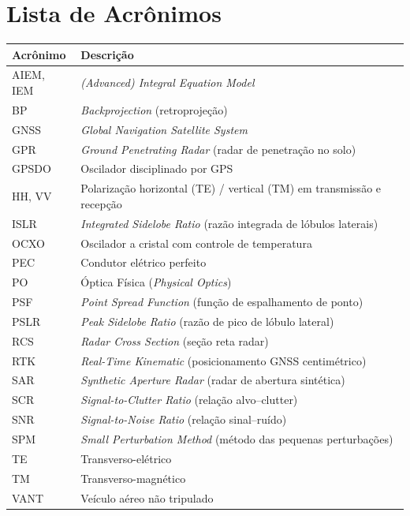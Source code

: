 \documentclass[12pt,a4paper,oneside]{book}
\theoremstyle{remark}
\theoremstyle{plain}
\theoremstyle{definition}
\begin{document}
\tableofcontents
\listoffigures
\listoftables

\chapter*{Lista de Acrônimos}

{\small
\begin{longtable}{ll}
\toprule
Acrônimo & Descrição \\
\midrule
\endhead
AIEM, IEM & \textit{(Advanced) Integral Equation Model} \\
BP     & \textit{Backprojection} (retroprojeção) \\
GNSS   & \textit{Global Navigation Satellite System} \\
GPR    & \textit{Ground Penetrating Radar} (radar de penetração no solo) \\
GPSDO  & Oscilador disciplinado por GPS \\
HH, VV & Polarização horizontal (TE) / vertical (TM) em transmissão e recepção \\
ISLR   & \textit{Integrated Sidelobe Ratio} (razão integrada de lóbulos laterais) \\
OCXO   & Oscilador a cristal com controle de temperatura \\
PEC    & Condutor elétrico perfeito \\
PO     & Óptica Física (\textit{Physical Optics}) \\
PSF    & \textit{Point Spread Function} (função de espalhamento de ponto) \\
PSLR   & \textit{Peak Sidelobe Ratio} (razão de pico de lóbulo lateral) \\
RCS    & \textit{Radar Cross Section} (seção reta radar) \\
RTK    & \textit{Real-Time Kinematic} (posicionamento GNSS centimétrico) \\
SAR    & \textit{Synthetic Aperture Radar} (radar de abertura sintética) \\
SCR    & \textit{Signal-to-Clutter Ratio} (relação alvo--clutter) \\
SNR    & \textit{Signal-to-Noise Ratio} (relação sinal--ruído) \\
SPM    & \textit{Small Perturbation Method} (método das pequenas perturbações) \\
TE     & Transverso-elétrico \\
TM     & Transverso-magnético \\
VANT   & Veículo aéreo não tripulado \\
\bottomrule
\end{longtable}}
\end{document}
